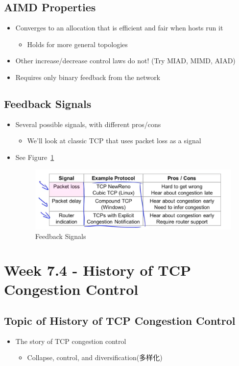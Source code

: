 \documentclass[12pt]{ctexart}   %
\begin{document}
	\subsection{AIMD Properties}
	\begin{itemize}
		\item Converges to an allocation that is efficient and fair when hosts run it
		\begin{itemize}
			\item Holds for more general topologies
		\end{itemize}
		
		\item Other increase/decrease control laws do not! (Try MIAD, MIMD, AIAD)
		\item Requires only binary feedback from the network
	\end{itemize}
	
	\subsection{Feedback Signals}
	\begin{itemize}
		\item Several possible signals, with different pros/cons
		\begin{itemize}
			\item We'll look at classic TCP that uses packet loss as a signal
		\end{itemize}
		\item See Figure~\ref{fig:7-3-6}
		  
		 \begin{figure}[h!] %
		\centering
		 \includegraphics[scale=0.7]{images/7-3-6}
		\caption{ Feedback Signals }
		 \label{fig:7-3-6}
		 \end{figure}
	\end{itemize}
	
\section{Week 7.4 - History of TCP Congestion Control}
	\subsection{Topic of History of TCP Congestion Control}
	\begin{itemize}
		\item The story of TCP congestion control
		\begin{itemize}
			\item Collapse, control, and diversification(多样化)
		\end{itemize}
	\end{itemize}	
	
\end{document}
